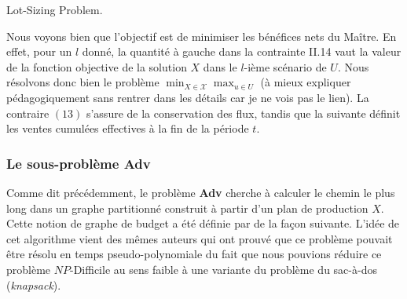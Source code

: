 \documentclass[12pt, a4paper, twoside]{report}
\numberwithin{equation}{section}
\newcommand{\adv}{\textbf{Adv} }
\begin{document}
	\vspace{-0.5em}
	{\centering
		\small Lot-Sizing Problem.\cite{portoleau:tel-04631599}\par
		\label{formulation_probleme_maitre}
	}
	
	Nous voyons bien que l'objectif est de minimiser les bénéfices nets du Maître. En effet, pour un $l$ donné, la quantité à gauche dans la contrainte II.14 vaut la valeur de la fonction objective de la solution $X$ dans le $l$-ième scénario de $U$. Nous résolvons donc bien le problème $\min_{X\in\mathcal{X}}\max_{u\in U}$ (à mieux expliquer pédagogiquement sans rentrer dans les détails car je ne vois pas le lien). La contraire $(13)$ s'assure de la conservation des flux, tandis que la suivante définit les ventes cumulées effectives à la fin de la période $t$.
	
	\subsubsection{Le sous-problème \adv}
	
	
	Comme dit précédemment, le problème \adv cherche à calculer le chemin le plus long dans un graphe partitionné construit à partir d'un plan de production $X$. Cette notion de graphe de budget a été définie par \cite{guillaume2020robustproductionplanningbudgeted} de la façon suivante. L'idée de cet algorithme vient des mêmes auteurs qui ont prouvé que ce problème pouvait être résolu en temps pseudo-polynomiale du fait que nous pouvions réduire ce problème $NP$-Difficile au sens faible à une variante du problème du sac-à-dos (\textit{knapsack}).
	
\end{document}
